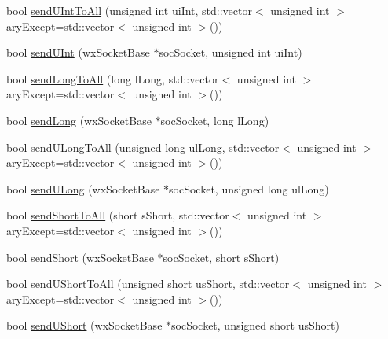 \begin{DoxyCompactItemize}
\item 
bool \hyperlink{class_rad_j_a_v_1_1_networking_1_1wx_widgets_t_c_p_server_a47832f18cdf7bee7b162c65986042041}{send\+U\+Int\+To\+All} (unsigned int ui\+Int, std\+::vector$<$ unsigned int $>$ ary\+Except=std\+::vector$<$ unsigned int $>$())
\item 
bool \hyperlink{class_rad_j_a_v_1_1_networking_1_1wx_widgets_t_c_p_server_af85993c2e1af60c0867c827c64cb0064}{send\+U\+Int} (wx\+Socket\+Base $\ast$soc\+Socket, unsigned int ui\+Int)
\item 
bool \hyperlink{class_rad_j_a_v_1_1_networking_1_1wx_widgets_t_c_p_server_a6a86177efba9d0d84ed34358b7d417a7}{send\+Long\+To\+All} (long l\+Long, std\+::vector$<$ unsigned int $>$ ary\+Except=std\+::vector$<$ unsigned int $>$())
\item 
bool \hyperlink{class_rad_j_a_v_1_1_networking_1_1wx_widgets_t_c_p_server_a82159c7ca10a3e5267936e8c02c8fbbc}{send\+Long} (wx\+Socket\+Base $\ast$soc\+Socket, long l\+Long)
\item 
bool \hyperlink{class_rad_j_a_v_1_1_networking_1_1wx_widgets_t_c_p_server_afce0d88374bfbd8ed5bc1f0eb67669d3}{send\+U\+Long\+To\+All} (unsigned long ul\+Long, std\+::vector$<$ unsigned int $>$ ary\+Except=std\+::vector$<$ unsigned int $>$())
\item 
bool \hyperlink{class_rad_j_a_v_1_1_networking_1_1wx_widgets_t_c_p_server_a45d4749373218af45168ac52b9cb7881}{send\+U\+Long} (wx\+Socket\+Base $\ast$soc\+Socket, unsigned long ul\+Long)
\item 
bool \hyperlink{class_rad_j_a_v_1_1_networking_1_1wx_widgets_t_c_p_server_a6d6fb3552b75634646d525d2c23e4904}{send\+Short\+To\+All} (short s\+Short, std\+::vector$<$ unsigned int $>$ ary\+Except=std\+::vector$<$ unsigned int $>$())
\item 
bool \hyperlink{class_rad_j_a_v_1_1_networking_1_1wx_widgets_t_c_p_server_a109a7cfe9f0aed3c0ab385e22b7dccfc}{send\+Short} (wx\+Socket\+Base $\ast$soc\+Socket, short s\+Short)
\item 
bool \hyperlink{class_rad_j_a_v_1_1_networking_1_1wx_widgets_t_c_p_server_a5f4d94b2c8d1972c3b01c6de0eee3fc6}{send\+U\+Short\+To\+All} (unsigned short us\+Short, std\+::vector$<$ unsigned int $>$ ary\+Except=std\+::vector$<$ unsigned int $>$())
\item 
bool \hyperlink{class_rad_j_a_v_1_1_networking_1_1wx_widgets_t_c_p_server_ab0c0c636b5b9eedba7402d18f177005d}{send\+U\+Short} (wx\+Socket\+Base $\ast$soc\+Socket, unsigned short us\+Short)
\item 

\end{DoxyCompactItemize}
